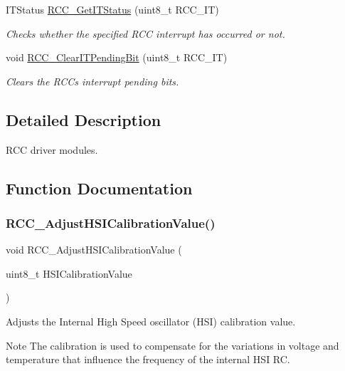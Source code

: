 \begin{DoxyCompactItemize}
I\+T\+Status \hyperlink{group___r_c_c_ga6126c99f398ee4be410ad76ae3aee18f}{R\+C\+C\+\_\+\+Get\+I\+T\+Status} (uint8\+\_\+t R\+C\+C\+\_\+\+IT)
\begin{DoxyCompactList}\small\item\em Checks whether the specified R\+CC interrupt has occurred or not. \end{DoxyCompactList}\item 
void \hyperlink{group___r_c_c_ga529842d165910f8f87e26115da36089b}{R\+C\+C\+\_\+\+Clear\+I\+T\+Pending\+Bit} (uint8\+\_\+t R\+C\+C\+\_\+\+IT)
\begin{DoxyCompactList}\small\item\em Clears the R\+CC\textquotesingle{}s interrupt pending bits. \end{DoxyCompactList}\end{DoxyCompactItemize}


\subsection{Detailed Description}
R\+CC driver modules. 



\subsection{Function Documentation}
\mbox{\label{group___r_c_c_gaa2d6a35f5c2e0f86317c3beb222677fc}} 
\subsubsection{\texorpdfstring{R\+C\+C\+\_\+\+Adjust\+H\+S\+I\+Calibration\+Value()}{RCC\_AdjustHSICalibrationValue()}}
{\footnotesize\ttfamily void R\+C\+C\+\_\+\+Adjust\+H\+S\+I\+Calibration\+Value (\begin{DoxyParamCaption}\item[{uint8\+\_\+t}]{H\+S\+I\+Calibration\+Value }\end{DoxyParamCaption})}



Adjusts the Internal High Speed oscillator (H\+SI) calibration value. 

\begin{DoxyNote}{Note}
The calibration is used to compensate for the variations in voltage and temperature that influence the frequency of the internal H\+SI RC. 
\end{DoxyNote}

